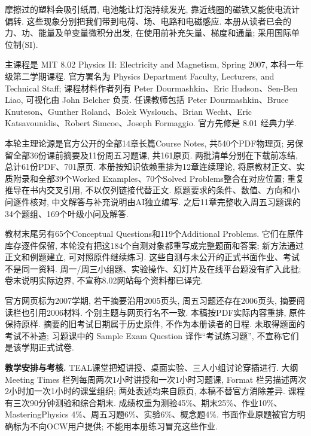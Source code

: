 \originalpreface
摩擦过的塑料会吸引纸屑, 电池能让灯泡持续发光, 靠近线圈的磁铁又能使电流计偏转. 这些现象分别把我们带到电荷、场、电路和电磁感应. 本册从读者已会的力、功、能量及单变量微积分出发, 在使用前补充矢量、梯度和通量; 采用国际单位制(SI).

主课程是 MIT 8.02 Physics II: Electricity and Magnetism, Spring 2007, 本科一年级第二学期课程. 官方署名为 Physics Department Faculty, Lecturers, and Technical Staff; 课程材料作者列有 Peter Dourmashkin、Eric Hudson、Sen-Ben Liao, 可视化由 John Belcher 负责. 任课教师包括 Peter Dourmashkin、Bruce Knuteson、Gunther Roland、Bolek Wyslouch、Brian Wecht、Eric Katsavounidis、Robert Simcoe、Joseph Formaggio. 官方先修是 8.01 经典力学.

本轮主理论源是官方公开的全部14章长篇Course Notes, 共540个PDF物理页; 另保留全部36份课前摘要及11份周五习题课, 共161原页. 两批清单分别在下载前冻结, 总计61份PDF、701原页. 本册按知识依赖重排为12章连续理论, 将原教材正文、实质附录和全部39个Worked Examples、70个Solved Problems整合在对应位置; 重复推导在书内交叉引用, 不以仅列链接代替正文. 原题要求的条件、数值、方向和小问逐件核对, 中文解答与补充说明由AI独立编写. 之后11章完整收入周五习题课的34个题组、169个叶级小问及解答.

教材末尾另有65个Conceptual Questions和119个Additional Problems. 它们在原件库存逐件保留, 本轮没有把这184个自测对象都重写成完整题面和答案; 新方法通过正文和例题建立, 可对照原件继续练习. 这些自测与未公开的正式书面作业、考试不是同一资料. 周一/周三小组题、实验操作、幻灯片及在线平台题没有扩入此批; 卷末说明实际边界, 不宣称8.02网站每个资料都已译完.

官方网页标为2007学期, 若干摘要沿用2005页头, 周五习题还存在2006页头, 摘要阅读栏也引用2006材料. 个别主题与网页行名不一致. 本稿按PDF实际内容重排, 原件保持原样. 摘要的旧考试日期属于历史原件, 不作为本册读者的日程. 未取得题面的考试不补造; 习题课中的 Sample Exam Question 译作“考试练习题”, 不宣称它们是该学期正式试卷.

\noindent\textbf{教学安排与考核.} TEAL课堂把短讲授、桌面实验、三人小组讨论穿插进行. 大纲 Meeting Times 栏列每周两次1小时讲授和一次1小时习题课, Format 栏另描述两次2小时加一次1小时的课堂组织; 两处表述均来自原页, 本稿不替官方消除差异. 课程有三次90分钟测验和综合期末. 成绩权重为测验45\%、期末25\%、作业10\%、MasteringPhysics 4\%、周五习题6\%、实验6\%、概念题4\%. 书面作业原题被官方明确标为不向OCW用户提供; 不能用本册练习冒充这些作业.

